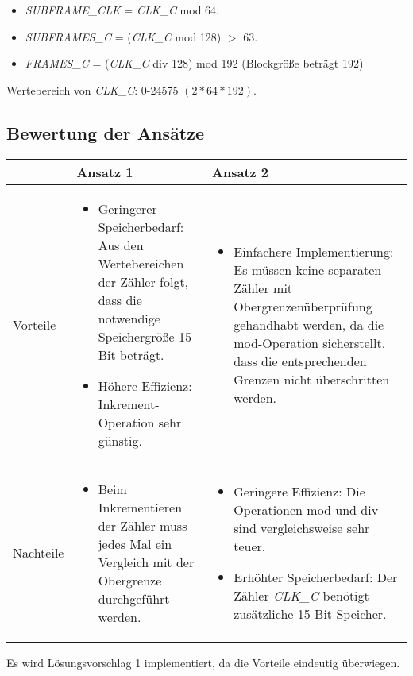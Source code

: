 \documentclass[12pt,a4paper]{article}
\begin{document}
\begin{itemize}
\item \emph{SUBFRAME\_CLK} = \emph{CLK\_C} mod 64.
\item \emph{SUBFRAMES\_C} = (\emph{CLK\_C} mod 128) \(>\) 63.
\item \emph{FRAMES\_C} = (\emph{CLK\_C} div 128) mod 192 (Blockgröße beträgt 192)
\end{itemize}

Wertebereich von \emph{CLK\_C}: 0-24575 \((2 * 64 * 192)\).


\subsection{Bewertung der Ansätze}

\begin{center}
  \begin{tabular}{| l | p{6cm} | p{6cm} |}
    \hline
	 & Ansatz 1 & Ansatz 2 \\
    \hline
	 Vorteile &  
     \begin{itemize}[leftmargin=0.4cm]
		\item Geringerer Speicherbedarf: Aus den Wertebereichen der Zähler folgt, dass die notwendige Speichergröße 15 Bit beträgt.
		\item Höhere Effizienz: Inkrement-Operation sehr günstig.
	 \end{itemize}
     &  
     \begin{itemize}[leftmargin=0.4cm]
		\item Einfachere Implementierung: Es müssen keine separaten Zähler mit Obergrenzenüberprüfung gehandhabt werden, da die mod-Operation sicherstellt, dass die entsprechenden Grenzen nicht überschritten werden.
	 \end{itemize}
     \\
    \hline
    
	 Nachteile &
     \begin{itemize}[leftmargin=0.4cm]
		\item Beim Inkrementieren der Zähler muss jedes Mal ein Vergleich mit der Obergrenze durchgeführt werden.
	 \end{itemize}
     &
     \begin{itemize}[leftmargin=0.4cm]
        \item Geringere Effizienz: Die Operationen mod und div sind vergleichsweise sehr teuer.
        \item Erhöhter Speicherbedarf: Der Zähler \emph{CLK\_C} benötigt zusätzliche 15 Bit Speicher.
	 \end{itemize}
     \\
     \hline
  \end{tabular}
\end{center}

\noindent
Es wird Lösungsvorschlag 1 implementiert, da die Vorteile eindeutig überwiegen.
\end{document}
